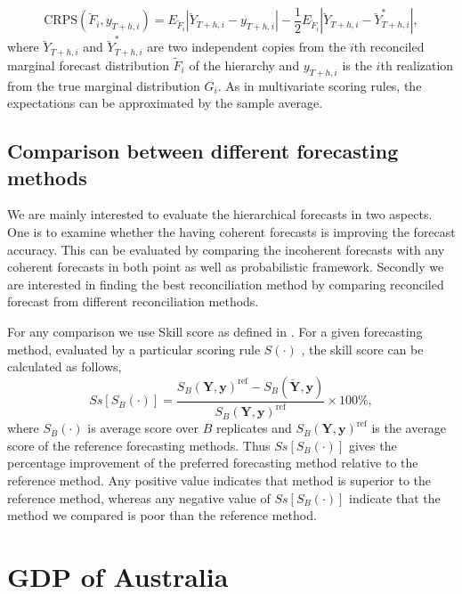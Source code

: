 \documentclass[graybox]{svmult}
\begin{document}
\begin{equation} \label{eq:24}
\text{CRPS}(\breve{F}_i,y_{T+h,i}) = E_{\breve{F}_i}|\breve{Y}_{T+h,i}-y_{T+h,i}| - \frac{1}{2}E_{\breve{F}_i}|\breve{Y}_{T+h,i}-\breve{Y}^*_{T+h,i}|,
\end{equation}
where $\breve{Y}_{T+h,i}$ and $\breve{Y}^*_{T+h,i}$ are two independent copies from the $i$th reconciled marginal forecast distribution $\tilde{F}_i$ of the hierarchy and $y_{T+h,i}$ is the $i$th realization from the true marginal distribution $G_i$. As in multivariate scoring rules, the expectations can be approximated by the sample average.

\subsection{Comparison between different forecasting methods}

We are mainly interested to evaluate the hierarchical forecasts in two aspects. One is to examine whether the having coherent forecasts is improving the forecast accuracy. This can be evaluated by comparing the incoherent forecasts with any coherent forecasts in both point as well as probabilistic framework. Secondly we are interested in finding the best reconciliation method by comparing reconciled forecast from different reconciliation methods.

For any comparison we use Skill score as defined in \citep{Gneiting2007}. For a given forecasting method, evaluated by a particular scoring rule $S(\cdot)$ , the skill score can be calculated as follows,
\begin{equation} \label{eq:25}
Ss[S_B(\cdot)] = \frac{S_B(\bm{Y},\bm{y})^{\text{ref}} - S_B(\breve{\bm{Y}},\bm{y})}{S_B(\bm{Y},\bm{y})^{\text{ref}}}\times 100\%,
\end{equation}
where $S_B(\cdot)$ is average score over $B$ replicates and $S_B(\bm{Y},\bm{y})^{\text{ref}}$ is the average score of the reference forecasting methods. Thus $Ss[S_B(\cdot)]$ gives the percentage improvement of the preferred forecasting method relative to the reference method. Any positive value indicates that method is superior to the reference method, whereas any negative value of $Ss[S_B(\cdot)]$ indicate that the method we compared is poor than the reference method.


\section{GDP of Australia}
\end{document}
